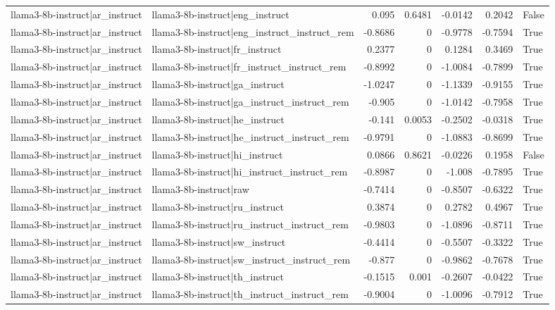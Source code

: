 \begin{table}
\begin{tabular}{l l r r r r l}
llama3-8b-instruct|ar_instruct & llama3-8b-instruct|eng_instruct & 0.095 & 0.6481 & -0.0142 & 0.2042 & False \\
llama3-8b-instruct|ar_instruct & llama3-8b-instruct|eng_instruct_instruct_rem & -0.8686 & 0 & -0.9778 & -0.7594 & True \\
llama3-8b-instruct|ar_instruct & llama3-8b-instruct|fr_instruct & 0.2377 & 0 & 0.1284 & 0.3469 & True \\
llama3-8b-instruct|ar_instruct & llama3-8b-instruct|fr_instruct_instruct_rem & -0.8992 & 0 & -1.0084 & -0.7899 & True \\
llama3-8b-instruct|ar_instruct & llama3-8b-instruct|ga_instruct & -1.0247 & 0 & -1.1339 & -0.9155 & True \\
llama3-8b-instruct|ar_instruct & llama3-8b-instruct|ga_instruct_instruct_rem & -0.905 & 0 & -1.0142 & -0.7958 & True \\
llama3-8b-instruct|ar_instruct & llama3-8b-instruct|he_instruct & -0.141 & 0.0053 & -0.2502 & -0.0318 & True \\
llama3-8b-instruct|ar_instruct & llama3-8b-instruct|he_instruct_instruct_rem & -0.9791 & 0 & -1.0883 & -0.8699 & True \\
llama3-8b-instruct|ar_instruct & llama3-8b-instruct|hi_instruct & 0.0866 & 0.8621 & -0.0226 & 0.1958 & False \\
llama3-8b-instruct|ar_instruct & llama3-8b-instruct|hi_instruct_instruct_rem & -0.8987 & 0 & -1.008 & -0.7895 & True \\
llama3-8b-instruct|ar_instruct & llama3-8b-instruct|raw & -0.7414 & 0 & -0.8507 & -0.6322 & True \\
llama3-8b-instruct|ar_instruct & llama3-8b-instruct|ru_instruct & 0.3874 & 0 & 0.2782 & 0.4967 & True \\
llama3-8b-instruct|ar_instruct & llama3-8b-instruct|ru_instruct_instruct_rem & -0.9803 & 0 & -1.0896 & -0.8711 & True \\
llama3-8b-instruct|ar_instruct & llama3-8b-instruct|sw_instruct & -0.4414 & 0 & -0.5507 & -0.3322 & True \\
llama3-8b-instruct|ar_instruct & llama3-8b-instruct|sw_instruct_instruct_rem & -0.877 & 0 & -0.9862 & -0.7678 & True \\
llama3-8b-instruct|ar_instruct & llama3-8b-instruct|th_instruct & -0.1515 & 0.001 & -0.2607 & -0.0422 & True \\
llama3-8b-instruct|ar_instruct & llama3-8b-instruct|th_instruct_instruct_rem & -0.9004 & 0 & -1.0096 & -0.7912 & True \\

\end{tabular}
\end{table}
